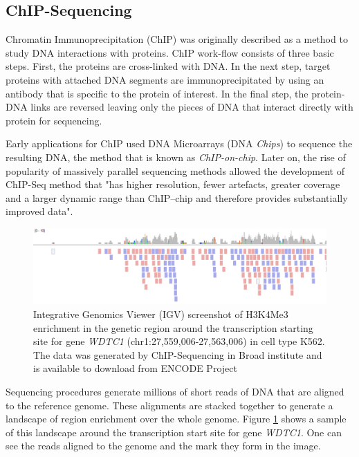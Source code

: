 \documentclass[12pt,a4paper]{article}
\begin{document}
\subsection{ChIP-Sequencing}

Chromatin Immunoprecipitation (ChIP) was originally described as a method to
study DNA interactions with proteins\cite{Solomon:1988gv}. ChIP work-flow
consists of three basic steps\cite{Mardis:2007wa}.  First, the proteins are
cross-linked with DNA. In the next step, target proteins with attached DNA
segments are immunoprecipitated by using an antibody that is specific to the
protein of interest. In the final step, the protein-DNA links are reversed leaving
only the pieces of DNA that interact directly with protein for sequencing.

Early applications for ChIP used DNA Microarrays (DNA \emph{Chips}) to sequence
the resulting DNA\cite{Blat:1999wk}, the method that is known as
\emph{ChIP-on-chip}. Later on, the rise of popularity of massively parallel
sequencing methods allowed the development of ChIP-Seq method
\cite{Johnson:2007fh} that "has higher resolution, fewer artefacts, greater
coverage and a larger dynamic range than ChIP–chip and therefore provides
substantially improved data"\cite{Park:2009wc}.

\begin{figure}[t]
    \centering
    \includegraphics[width=\textwidth]{images/introduction/igv_panel_screenshot_k562_h3k4me3_WDTC1-transparentbcg.png}
    \caption{Integrative Genomics Viewer (IGV) \cite{Thorvaldsdottir:2012wy} screenshot of H3K4Me3 enrichment in the genetic region around the transcription starting site for gene \emph{WDTC1} (chr1:27,559,006-27,563,006) in cell type K562. The data was generated by ChIP-Sequencing in Broad institute and is available to download from ENCODE Project \cite{TheENCODEProjectConsortium:2004db}}
    \label{fig:igv_screen}
\end{figure}

Sequencing procedures generate millions of short reads of DNA that are aligned
to the reference genome. These alignments are stacked together to generate a
landscape of region enrichment over the whole genome.  Figure
\ref{fig:igv_screen} shows a sample of this landscape around the transcription
start site for gene \emph{WDTC1}. One can see the reads aligned to the genome
and the mark they form in the image.
\end{document}
